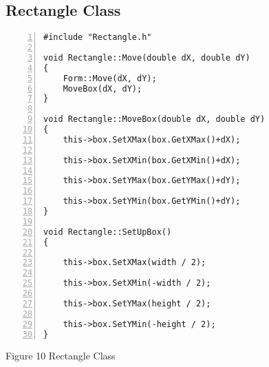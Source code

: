 \documentclass{llncs}
\begin{document}
\subsection{Rectangle Class}
\begin{lstlisting}[basicstyle=\footnotesize\ttfamily, numbers=left, stepnumber=1, numberstyle = \normalsize]
#include "Rectangle.h"

void Rectangle::Move(double dX, double dY)
{
	Form::Move(dX, dY);
	MoveBox(dX, dY);
}

void Rectangle::MoveBox(double dX, double dY)
{
	this->box.SetXMax(box.GetXMax()+dX);

	this->box.SetXMin(box.GetXMin()+dX);

	this->box.SetYMax(box.GetYMax()+dY);

	this->box.SetYMin(box.GetYMin()+dY);
}

void Rectangle::SetUpBox()
{

	this->box.SetXMax(width / 2);

	this->box.SetXMin(-width / 2);

	this->box.SetYMax(height / 2);

	this->box.SetYMin(-height / 2);
}
\end{lstlisting}
\footnotesize{Figure 10 Rectangle Class}
\end{document}

